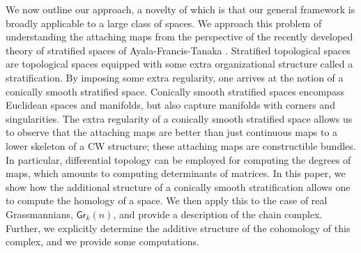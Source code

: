 \documentclass{article}
\newcommand{\msf}[1]{\mathsf{#1}}
\newcommand{\gr}{\msf{Gr}}
\newcommand{\nchoosek}{\textstyle\genfrac{\lbrace}{\rbrace}{0pt}{}}
\newtheorem{conjecture}[theorem]{Conjecture}
\theoremstyle{definition}
\begin{document}
We now outline our approach, a novelty of which
is that our general framework is broadly applicable to a large class of spaces.
We approach this problem of understanding the attaching maps
from the perspective of the recently developed theory of stratified spaces of Ayala-Francis-Tanaka \cite{aft1}. 
Stratified topological spaces are topological spaces equipped with some extra organizational structure called a stratification. By imposing some extra regularity, one arrives at the notion of a conically
smooth stratified space. Conically smooth stratified spaces encompass Euclidean spaces and manifolds, but also
capture manifolds with corners and singularities. 
The extra regularity of a conically smooth stratified space allows us to observe
that the attaching maps are better than just continuous maps to a lower skeleton of a CW structure; these attaching
maps are constructible bundles. In particular, differential topology can be employed for computing the degrees of
maps, which amounts to computing determinants of matrices.
In this paper, we show how the additional structure of a 
conically smooth stratification allows one to compute the homology of a space. We then apply this to the case of
real Grassmannians, $\gr_k(n)$, and provide a description of the chain complex. Further, we explicitly 
determine the additive structure of the cohomology of this complex, and we provide some computations.\\


\end{document}
